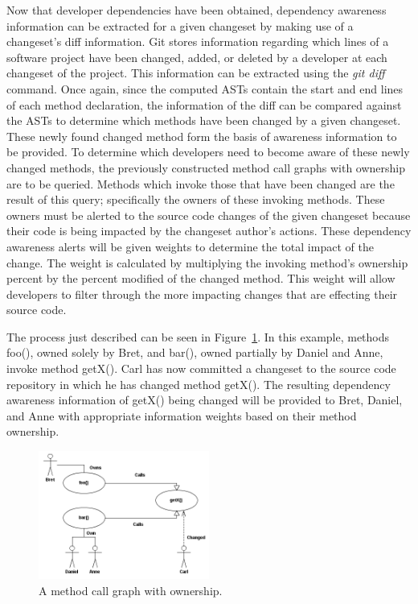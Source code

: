 \documentclass[conference]{IEEEtran}
\begin{document}
Now that developer dependencies have been obtained, dependency awareness
information can be extracted for a given changeset by making use of
a changeset's diff information. Git stores information regarding which 
lines of a software project have been changed, added, or deleted by a developer
at each changeset of the project. This information can be extracted 
using the \textit{git diff} command. Once again, since the computed
ASTs contain the start and end lines of each method declaration, the information
of the diff can be compared against the ASTs to determine which methods
have been changed by a given changeset. These newly found changed method
form the basis of awareness information to be provided. To determine which
developers need to become aware of these newly changed methods, the
previously constructed method call graphs with ownership are to be queried.
Methods which invoke those that have been changed are the result of this 
query; specifically the owners of these invoking methods. These owners
must be alerted to the source code changes of the given changeset because
their code is being impacted by the changeset author's actions. These 
dependency awareness alerts will be given weights to determine the
total impact of the change. The weight is calculated by multiplying the
invoking method's ownership percent by the percent modified of the changed
method. This weight will allow developers to filter through the more
impacting changes that are effecting their source code.

The process just described can be seen in Figure~\ref{fig:network}. In
this example, methods foo(), owned solely by Bret, and bar(), owned
partially by Daniel and Anne, invoke method getX(). Carl has now
committed a changeset to the source code repository in which he has
changed method getX(). The resulting dependency awareness information of 
getX() being changed will be provided to Bret, Daniel, and Anne with 
appropriate information weights based on their method ownership.

\begin{figure}[t]
\centering
\includegraphics[width=0.5\textwidth]{images/CallGraph}
\caption{A method call graph with ownership.\label{fig:network}}
\end{figure}
\end{document}
